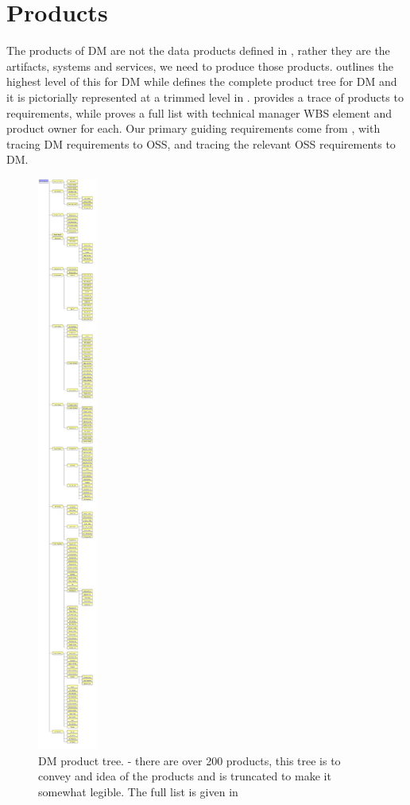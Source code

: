 \section{Products \label{sect:products}}

The products of DM are not the data products defined in , rather they are the artifacts, systems and services,  we need to produce those products.  outlines the highest level of this for DM while    defines the complete product tree for DM and it is pictorially represented at a trimmed level in  .
 provides a trace of products to requirements, while  proves a full list with technical manager WBS element and product owner for each.
Our primary guiding requirements come from , with  tracing DM requirements  to OSS, and  tracing the relevant OSS requirements to DM.

\begin{figure}[htbp]
	\begin{center}
		 \includegraphics[height=19cm]{ProductTree}
		 \caption{DM product tree. \label{fig:prods}- there are over 200 products, this tree is to convey and idea of the products and is truncated to make it somewhat legible.
		 The full list is given in 
	 }

	 \end{center}
 \end{figure}

